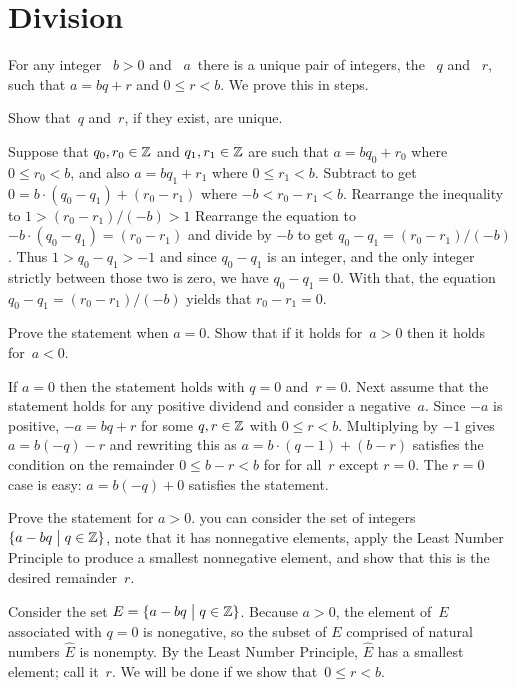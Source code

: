\documentclass{ibl}  %
\begin{document}
\section{Division}
\begin{problem}  For any integer 
~$b>0$ and ~$a\,$ there is a unique pair of
integers, the ~$q$ and ~$r$,
such that $a=bq+r$ and $0\leq r<b$.
We prove this in steps.
\begin{exes} 
\begin{exercise}
  Show that~$q$ and~$r$, if they exist, are unique.
\end{exercise}
\begin{answer}
  Suppose that $q_0,r_0\in\mathbb{Z}$ and $q_1,r_1\in\mathbb{Z}$ are such that
  $a=bq_0+r_0$ where $0\leq r_0<b$, and also
  $a=bq_1+r_1$ where $0\leq r_1<b$.
  Subtract to get $0=b\cdot(q_0-q_1)+(r_0-r_1)$ where $-b<r_0-r_1<b$.
  Rearrange the inequality to $1>(r_0-r_1)/(-b)>1$
  Rearrange the equation to $-b\cdot(q_0-q_1)=(r_0-r_1)$
  and divide by $-b$ to get $q_0-q_1=(r_0-r_1)/(-b)$.
  Thus  $1>q_0-q_1>-1$ and since $q_0-q_1$ is an integer, and
  the only integer strictly between those two is zero, we have $q_0-q_1=0$.
  With that, the equation $q_0-q_1=(r_0-r_1)/(-b)$ yields that $r_0-r_1=0$.
\end{answer}
\begin{exercise}
  Prove the statement when $a=0$.
  Show that if it holds for~$a>0$ then it holds
  for~$a<0$.
\end{exercise} 
\begin{answer}
  If $a=0$ then the statement holds with $q=0$ and~$r=0$.
  Next assume that the statement holds for any positive dividend
  and consider a negative~$a$.
  Since $-a$ is positive, $-a=bq+r$ for some 
  $q,r\in\mathbb{Z}$ with $0\leq r<b$.
  Multiplying by $-1$ gives $a=b(-q)-r$ and
  rewriting this as $a=b\cdot(q-1)+(b-r)$ satisfies the condition on the
  remainder $0\leq b-r<b$ for for all~$r$ except $r=0$.
  The $r=0$ case is easy: $a=b(-q)+0$ satisfies the statement.   
\end{answer}
\begin{exercise} 
  Prove the statement for $a>0$.
  \hint you can consider the set of integers $\{a-bq \bigm| q\in\mathbb{Z}\}$,
  note that it has nonnegative elements,
  apply the Least Number Principle
  to produce a smallest nonnegative element, and show that this is the desired
  remainder~$r$.
\end{exercise}
\begin{answer}
  Consider the set $E=\{a-bq \bigm| q\in\mathbb{Z}\}$.
  Because $a>0$, the element of~$E$ associated with $q=0$ is nonegative,
  so the subset of $E$ comprised of natural numbers $\hat{E}$ is nonempty.
  By the Least Number Principle, $\hat{E}$ has a smallest element;
  call it~$r$.
  We will be done if we show that~$0\leq r<b$.


\end{answer}
\end{exes}
\end{problem}
\end{document}
